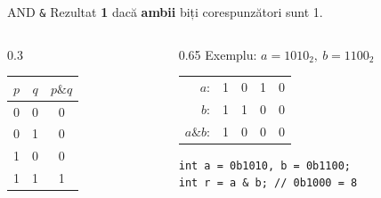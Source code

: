 ﻿\documentclass{beamer}
\begin{document}
\begin{frame}[fragile]{AND \textemdash{} \texttt{\&}}
  Rezultat \textbf{1} dacă \textbf{ambii} biți corespunzători sunt 1.
  \bigskip
  \begin{columns}[T]
    \begin{column}{0.3\textwidth}
      \begin{center}
      \begin{tabular}{ccc}
        \toprule
        $p$ & $q$ & $p \mathbin{\&} q$ \\
        \midrule
        0 & 0 & 0 \\
        0 & 1 & 0 \\
        1 & 0 & 0 \\
        1 & 1 & 1 \\
        \bottomrule
      \end{tabular}
      \end{center}
    \end{column}
    \begin{column}{0.65\textwidth}
      Exemplu: $a = 1010_2,\ b = 1100_2$
      \begin{center}
      \begin{tabular}{rcccc}
        $a$:            & 1 & 0 & 1 & 0 \\
        $b$:            & 1 & 1 & 0 & 0 \\
        \hline
        $a \mathbin{\&} b$: & 1 & 0 & 0 & 0 \\
      \end{tabular}
      \end{center}
      \begin{center}
      \begin{lstlisting}
int a = 0b1010, b = 0b1100;
int r = a & b; // 0b1000 = 8
      \end{lstlisting}
      \end{center}
    \end{column}
  \end{columns}
\end{frame}
\end{document}
